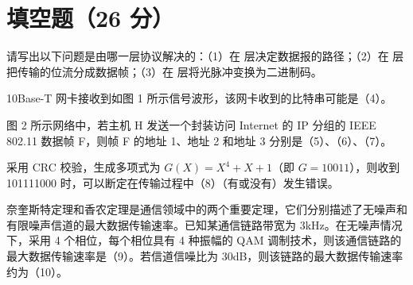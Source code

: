 \noindent{}\par
{}
\section{填空题（26 分）}
\begin{question}[index=1]
请写出以下问题是由哪一层协议解决的：（1）在 \underline{\hspace{4em}} 层决定数据报的路径；（2）在 \underline{\hspace{4em}} 层把传输的位流分成数据帧；（3）在 \underline{\hspace{4em}} 层将光脉冲变换为二进制码。
\end{question}
\begin{question}[index=2]
10Base-T 网卡接收到如图 1 所示信号波形，该网卡收到的比特串可能是（4）\underline{\hspace{7em}}。
\par\smallskip\noindent\makebox[\linewidth][c]{}
\par\noindent{}
\end{question}
\begin{question}[index=3]
图 2 所示网络中，若主机 H 发送一个封装访问 Internet 的 IP 分组的 IEEE 802.11 数据帧 F，则帧 F 的地址 1、地址 2 和地址 3 分别是（5）\underline{\hspace{5em}}、（6）\underline{\hspace{5em}}、（7）\underline{\hspace{5em}}。
\par\smallskip\noindent\makebox[\linewidth][c]{}
\par\noindent{}
\end{question}
\begin{question}[index=4]
采用 CRC 校验，生成多项式为 $G(X)=X^4+X+1$（即 $G=10011$），则收到 101111000 时，可以断定在传输过程中（8）\underline{\hspace{4em}}（有或没有）发生错误。
\end{question}
\begin{question}[index=5]
奈奎斯特定理和香农定理是通信领域中的两个重要定理，它们分别描述了无噪声和有限噪声信道的最大数据传输速率。已知某通信链路带宽为 3kHz。在无噪声情况下，采用 4 个相位，每个相位具有 4 种振幅的 QAM 调制技术，则该通信链路的最大数据传输速率是（9）\underline{\hspace{5em}}。若信道信噪比为 30dB，则该链路的最大数据传输速率约为（10）\underline{\hspace{5em}}。
\end{question}
